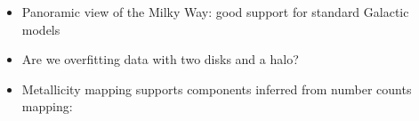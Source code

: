 \documentclass[letterpaper,landscape]{slides}
\begin{document}
\begin{slide}
{\begin{minipage}[t]{17cm}
\begin{itemize}
\item Panoramic view of the Milky Way:
{\color{blue} good support for standard Galactic models}
\item
{\color{red} Are we overfitting data with two disks and a halo?} 
\item
{\color{blue} Metallicity mapping} supports components inferred 
from number counts mapping:
\end{itemize}     
\vskip 0.3in

\end{minipage}}
\vfill 
\end{slide}
\end{document}
